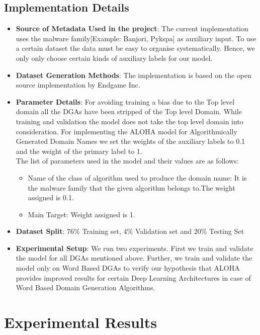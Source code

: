 \documentclass[conference]{IEEEtran}
\begin{document}
\subsection{Implementation Details\cite{b13}}
\begin{itemize}
\item \textbf{Source of Metadata Used in the project}: The current implementation uses the malware family[Example: Banjori, Pykspa] as auxiliary input. To use a certain dataset the data must be easy to organise systematically. Hence, we only only choose certain kinds of auxiliary labels for our model.
\item \textbf{Dataset Generation Methods}: The implementation is based on the open source implementation by Endgame Inc.\cite{b7}

\item \textbf{Parameter Details}:
For avoiding training a bias due to the Top level domain all the DGAs have been stripped of the Top level Domain. While training and validation the model does not take the top level domain into consideration.
For implementing the ALOHA model for Algorithmically Generated Domain Names we set the weights of the auxiliary labels to 0.1 and the weight of the primary label to 1.\cite{b5}\\
The list of parameters used in the model and their values are as follows:

\begin{itemize}
\item Name of the class of algorithm used to produce the domain name: It is the malware family that the given algorithm belongs to.The weight assigned is 0.1.
\item Main Target: Weight assigned is 1.
\end{itemize} 
\item \textbf{Dataset Split}: 76\% Training set, 4\% Validation set and 20\% Testing Set 
\item \textbf{Experimental Setup}: We run two experiments. First we train and validate the model for all DGAs mentioned above. Further, we train and validate the model only on Word Based DGAs to verify our hypothesis that ALOHA provides improved results for certain Deep Learning Architectures in case of Word Based Domain Generation Algorithms.  

\end{itemize}
\section{Experimental Results}
\end{document}
